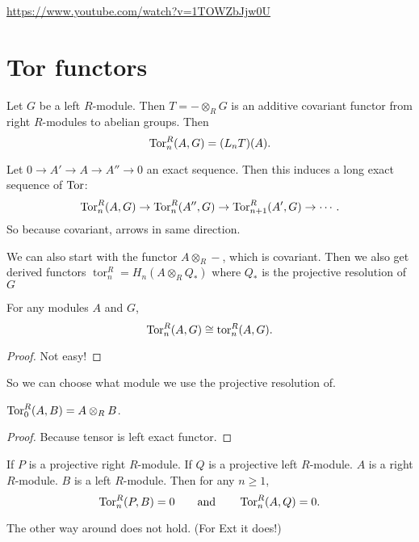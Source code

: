 \url{https://www.youtube.com/watch?v=1TOWZbJjw0U}

\section{Tor functors}

Let $G$ be a left $R$-module.
Then $T = - \otimes_R G$ is an additive covariant functor from right $R$-modules to abelian groups.
Then
\[
    \operatorname{Tor}_n^{R}(A, G) = (L_n T)(A)
.\] 

Let $0 \to  A' \to  A \to  A'' \to  0$ an exact sequence.
Then this induces a long exact sequence of $\operatorname{Tor}$:
\[
    \operatorname{Tor}_n^{R}(A, G) \to  \operatorname{Tor}_n^{R}(A'', G) \to  \operatorname{Tor}_{n+1}^{R}(A', G) \to  \cdots
.\] 
So because covariant, arrows in same direction.

\begin{remark}
    We can also start with the functor $A \otimes_R -$, which is covariant.
    Then we also get derived functors $\operatorname{tor}_n^{R} = H_n(A \otimes_R Q_*)$ where $Q_*$ is the projective resolution of $G$
\end{remark}
\begin{theorem}
    For any modules $A$ and $G$, 
    \[
        \operatorname{Tor}_n^{R}(A, G) \cong \operatorname{tor}_n^{R}(A, G)
    .\] 
\end{theorem}
\begin{proof}
    Not easy!
\end{proof}

So we can choose what module we use the projective resolution of.

\begin{prop}[2.16]
    $\operatorname{Tor}_0^{R}(A, B) = A \otimes_R B$.
\end{prop}
\begin{proof}
    Because tensor is left exact functor.
\end{proof}

\begin{theorem}[2.18]
    If $P$ is a projective right $R$-module.
    If $Q$ is a projective left  $R$-module.
    $A$ is a right $R$-module.
    $B$ is a left $R$-module.
    Then for any $n\ge 1$,
    \[
        \operatorname{Tor}_n^{R}(P, B) = 0 \qquad \text{and} \qquad
        \operatorname{Tor}_n^{R}(A, Q) = 0
    .\] 
\end{theorem}
\begin{remark}
    The other way around does not hold. (For Ext it does!)
\end{remark}

